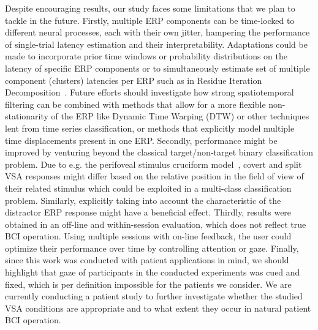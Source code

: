Despite encouraging results, our study faces some limitations that we plan to
tackle in the future.
Firstly, multiple ERP components can be time-locked to different neural
processes, each with their own jitter, hampering the performance of
single-trial latency estimation and their interpretability.
Adaptations could be made to incorporate prior time windows or probability
distributions on the latency of specific ERP components or to simultaneously
estimate set of multiple component (clusters) latencies per ERP such as in Residue Iteration
Decomposition~\cite{Ouyang2017}.
Future efforts should investigate how strong
spatiotemporal filtering can be combined with methods that allow for a more
flexible non-stationarity of the ERP like Dynamic Time Warping (DTW) or other
techniques lent from time series classification, or methods that explicitly model multiple time
displacements present in one ERP.
Secondly, performance might be improved by venturing beyond the classical
target/non-target binary classification problem.
Due to e.g. the perifoveal stimulus cruciform model~\cite{Vanegas2013}, covert and split VSA
responses might differ based on the relative position in the field of view of
their related stimulus which could be exploited in a multi-class classification
problem.
Similarly, explicitly taking into account the characteristic of the distractor ERP
response might have a beneficial effect.
Thirdly, results were obtained in an off-line and within-session evaluation,
which does not reflect true BCI operation.
Using multiple sessions with on-line feedback, the user could optimize their
performance over time by controlling attention or gaze.
Finally, since this work was conducted with patient applications in mind, we
should highlight that gaze of participants in the conducted experiments was
cued and fixed, which is per definition impossible for the patients we consider.
We are currently conducting a patient study to further investigate whether the
studied VSA conditions are appropriate and to what extent they occur in
natural patient BCI operation.


